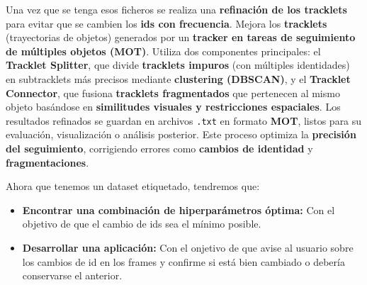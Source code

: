\documentclass[12pt, a4paper, twoside]{article}
\begin{document}
	Una vez que se tenga esos ficheros se realiza una \textbf{refinación de los tracklets} para evitar que se cambien los \textbf{ids con frecuencia}. Mejora los \textbf{tracklets} (trayectorias de objetos) generados por un \textbf{tracker en tareas de seguimiento de múltiples objetos (MOT)}. Utiliza dos componentes principales: el \textbf{Tracklet Splitter}, que divide \textbf{tracklets impuros} (con múltiples identidades) en subtracklets más precisos mediante \textbf{clustering (DBSCAN)}, y el \textbf{Tracklet Connector}, que fusiona \textbf{tracklets fragmentados} que pertenecen al mismo objeto basándose en \textbf{similitudes visuales y restricciones espaciales}. Los resultados refinados se guardan en archivos \texttt{.txt} en formato \textbf{MOT}, listos para su evaluación, visualización o análisis posterior. Este proceso optimiza la \textbf{precisión del seguimiento}, corrigiendo errores como \textbf{cambios de identidad} y \textbf{fragmentaciones}.\vspace{0.5cm}
	
	
	Ahora que tenemos un dataset etiquetado, tendremos que:
	
	\begin{itemize}
		\item \textbf{Encontrar una combinación de hiperparámetros óptima: } Con el objetivo de que el cambio de ids sea el mínimo posible.
		\item \textbf{Desarrollar una aplicación: } Con el onjetivo de que avise al usuario sobre los cambios de id en los frames y confirme si está bien cambiado o debería conservarse el anterior.
	\end{itemize}
	
	\printbibliography
	
	
	
	
\end{document}
